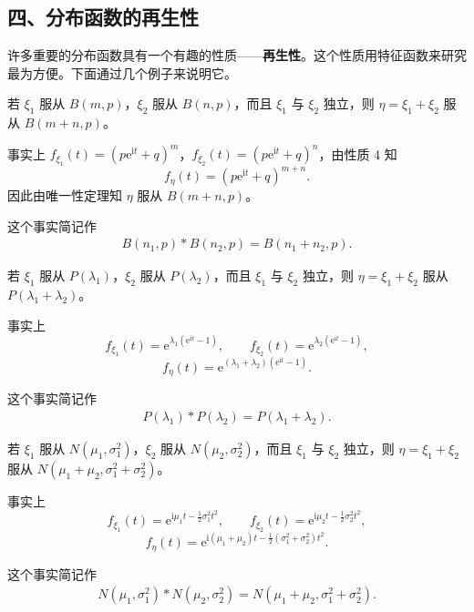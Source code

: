 \documentclass[../../main.tex]{subfiles}
\begin{document}
\subsection*{四、分布函数的再生性}

许多重要的分布函数具有一个有趣的性质——\textbf{再生性}。这个性质用特征函数来研究最为方便。下面通过几个例子来说明它。

\begin{example}[二项分布的再生性]\label{example:ch04-二项再生}
若 $\xi_1$ 服从 $B(m,p)$，$\xi_2$ 服从 $B(n,p)$，而且 $\xi_1$ 与 $\xi_2$ 独立，则 $\eta=\xi_1+\xi_2$ 服从 $B(m+n,p)$。

事实上 $f_{\xi_1}(t)=(p\mathrm{e}^{\mathrm{i}t}+q)^m$，$f_{\xi_2}(t)=(p\mathrm{e}^{\mathrm{i}t}+q)^n$，由性质 4 知
\[
f_\eta(t)=(p\mathrm{e}^{\mathrm{i}t}+q)^{m+n}.
\]
因此由唯一性定理知 $\eta$ 服从 $B(m+n,p)$。

这个事实简记作
\begin{align}
B(n_1,p)*B(n_2,p)=B(n_1+n_2,p).\label{align:ch04-二项再生}
\end{align}
\end{example}

\begin{example}\label{example:ch04-Poisson再生}
若 $\xi_1$ 服从 $P(\lambda_1)$，$\xi_2$ 服从 $P(\lambda_2)$，而且 $\xi_1$ 与 $\xi_2$ 独立，则 $\eta=\xi_1+\xi_2$ 服从 $P(\lambda_1+\lambda_2)$。

事实上
\[
f_{\xi_1}(t)=\mathrm{e}^{\lambda_1(\mathrm{e}^{\mathrm{i}t}-1)},\qquad
f_{\xi_2}(t)=\mathrm{e}^{\lambda_2(\mathrm{e}^{\mathrm{i}t}-1)},
\]
\[
f_\eta(t)=\mathrm{e}^{(\lambda_1+\lambda_2)(\mathrm{e}^{\mathrm{i}t}-1)}.
\]

这个事实简记作
\begin{align}
P(\lambda_1)*P(\lambda_2)=P(\lambda_1+\lambda_2).\label{align:ch04-Poisson再生}
\end{align}
\end{example}

\begin{example}[正态分布的再生性]\label{example:ch04-正态再生}
若 $\xi_1$ 服从 $N(\mu_1,\sigma_1^2)$，$\xi_2$ 服从 $N(\mu_2,\sigma_2^2)$，而且 $\xi_1$ 与 $\xi_2$ 独立，则 $\eta=\xi_1+\xi_2$ 服从 $N(\mu_1+\mu_2,\sigma_1^2+\sigma_2^2)$。

事实上
\[
f_{\xi_1}(t)=\mathrm{e}^{\mathrm{i}\mu_1 t-\frac12\sigma_1^2 t^2},\qquad
f_{\xi_2}(t)=\mathrm{e}^{\mathrm{i}\mu_2 t-\frac12\sigma_2^2 t^2},
\]
\[
f_\eta(t)=\mathrm{e}^{\mathrm{i}(\mu_1+\mu_2)t-\frac12(\sigma_1^2+\sigma_2^2)t^2}.
\]

这个事实简记作
\begin{align}
N(\mu_1,\sigma_1^2)*N(\mu_2,\sigma_2^2)=N(\mu_1+\mu_2,\sigma_1^2+\sigma_2^2).\label{align:ch04-正态再生}
\end{align}
\end{example}
\end{document}
